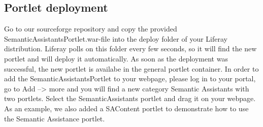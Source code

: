\subsection{Portlet deployment}
Go to our sourceforge repository and copy the provided SemanticAssistantsPortlet.war-file into the deploy folder of your Liferay distribution. Liferay polls on this folder every few seconds, so it will find the new portlet and will deploy it automatically. As soon as the deployment was successful, the new portlet is availabe in the general portlet container. In order to add the SemanticAssistantsPortlet to your webpage, please log in to your portal, go to Add --> more and you will find a new category Semantic Assistants with two portlets. Select the SemanticAssistants portlet and drag it on your webpage. As an example, we also added a SAContent portlet to demonstrate how to use the Semantic Assistance portlet.

